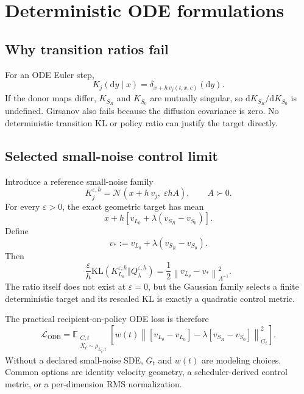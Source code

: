 \documentclass[11pt,a4paper]{article}
\newcommand{\E}{\mathbb{E}}
\newcommand{\N}{\mathcal{N}}
\newcommand{\KL}{\mathrm{KL}}
\newcommand{\norm}[1]{\left\lVert #1 \right\rVert}
\newcommand{\dd}{\mathrm{d}}
\newcommand{\Sbase}{S_0}
\newcommand{\Srl}{S_R}
\newcommand{\Lbase}{L_0}
\newcommand{\Lactor}{L_\theta}
\newcommand{\Lbeh}{L_{\bar\theta}}
\theoremstyle{plain}
\theoremstyle{definition}
\begin{document}
\section{Deterministic ODE formulations}
\label{sec:ode}

\subsection{Why transition ratios fail}

For an ODE Euler step,
\begin{equation}
K_j(\dd y\mid x)
=
\delta_{x+h\,v_j(t,x,c)}(\dd y).
\label{eq:ode-dirac}
\end{equation}
If the donor maps differ, $K_{\Srl}$ and $K_{\Sbase}$ are mutually singular, so
$\dd K_{\Srl}/\dd K_{\Sbase}$ is undefined.  Girsanov also fails because the diffusion covariance
is zero.  No deterministic transition KL or policy ratio can justify the target directly.

\subsection{Selected small-noise control limit}

Introduce a reference small-noise family
\begin{equation}
K_j^{\varepsilon,h}
=
\N(x+h\,v_j,\;\varepsilon hA),
\qquad
A\succ0.
\label{eq:small-noise-family}
\end{equation}
For every $\varepsilon>0$, the exact geometric target has mean
\begin{equation}
x+h
\left[
v_{\Lbase}
+\lambda(v_{\Srl}-v_{\Sbase})
\right].
\label{eq:small-noise-target}
\end{equation}
Define
\begin{equation}
v_*:=v_{\Lbase}+\lambda(v_{\Srl}-v_{\Sbase}).
\label{eq:ode-field-target}
\end{equation}
Then
\begin{equation}
\frac{\varepsilon}{h}
\KL(K_{\Lactor}^{\varepsilon,h}\Vert Q_\lambda^{\varepsilon,h})
=
\frac12
\norm{v_{\Lactor}-v_*}_{A^{-1}}^2.
\label{eq:ode-control-limit}
\end{equation}
The ratio itself does not exist at $\varepsilon=0$, but the Gaussian family selects a finite
deterministic target and its rescaled KL is exactly a quadratic control metric.

The practical recipient-on-policy ODE loss is therefore
\begin{equation}
\boxed{
\mathcal L_{\mathrm{ODE}}
=
\E_{\substack{
C,t\\
X_t\sim\rho_{\Lbeh,t}
}}
\left[
w(t)
\norm{
[v_{\Lactor}-v_{\Lbase}]
-\lambda[v_{\Srl}-v_{\Sbase}]
}_{G_t}^2
\right].
}
\label{eq:ode-main-loss}
\end{equation}
Without a declared small-noise SDE, $G_t$ and $w(t)$ are modeling choices.  Common options are
identity velocity geometry, a scheduler-derived control metric, or a per-dimension RMS
normalization.
\end{document}
